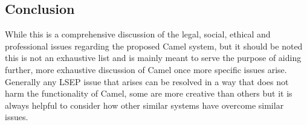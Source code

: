 \subsection*{Conclusion}
While this is a comprehensive discussion of the legal, social, ethical and professional issues regarding the proposed Camel system, but it should be noted this is not an exhaustive list and is mainly meant to serve the purpose of aiding further, more exhaustive discussion of Camel once more specific issues arise. Generally any LSEP issue that arises can be resolved in a way that does not harm the functionality of Camel, some are more creative than others but it is always helpful to consider how other similar systems have overcome similar issues.
